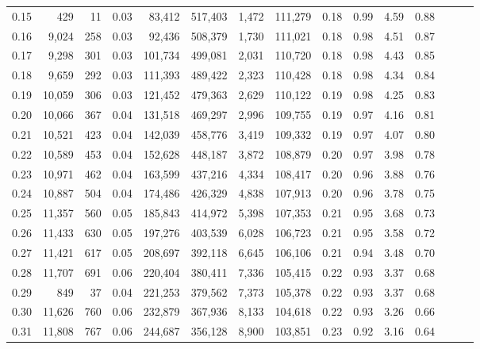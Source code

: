 \begin{tabular}{rrrrrrrrrrrrrrr}
0.15 &     429 &     11 &  0.03 &   83,412 &  517,403 &    1,472 &  111,279 &  0.18 &  0.99 &  4.59 &      0.88 \\
0.16 &   9,024 &    258 &  0.03 &   92,436 &  508,379 &    1,730 &  111,021 &  0.18 &  0.98 &  4.51 &      0.87 \\
0.17 &   9,298 &    301 &  0.03 &  101,734 &  499,081 &    2,031 &  110,720 &  0.18 &  0.98 &  4.43 &      0.85 \\
0.18 &   9,659 &    292 &  0.03 &  111,393 &  489,422 &    2,323 &  110,428 &  0.18 &  0.98 &  4.34 &      0.84 \\
0.19 &  10,059 &    306 &  0.03 &  121,452 &  479,363 &    2,629 &  110,122 &  0.19 &  0.98 &  4.25 &      0.83 \\
0.20 &  10,066 &    367 &  0.04 &  131,518 &  469,297 &    2,996 &  109,755 &  0.19 &  0.97 &  4.16 &      0.81 \\
0.21 &  10,521 &    423 &  0.04 &  142,039 &  458,776 &    3,419 &  109,332 &  0.19 &  0.97 &  4.07 &      0.80 \\
0.22 &  10,589 &    453 &  0.04 &  152,628 &  448,187 &    3,872 &  108,879 &  0.20 &  0.97 &  3.98 &      0.78 \\
0.23 &  10,971 &    462 &  0.04 &  163,599 &  437,216 &    4,334 &  108,417 &  0.20 &  0.96 &  3.88 &      0.76 \\
0.24 &  10,887 &    504 &  0.04 &  174,486 &  426,329 &    4,838 &  107,913 &  0.20 &  0.96 &  3.78 &      0.75 \\
0.25 &  11,357 &    560 &  0.05 &  185,843 &  414,972 &    5,398 &  107,353 &  0.21 &  0.95 &  3.68 &      0.73 \\
0.26 &  11,433 &    630 &  0.05 &  197,276 &  403,539 &    6,028 &  106,723 &  0.21 &  0.95 &  3.58 &      0.72 \\
0.27 &  11,421 &    617 &  0.05 &  208,697 &  392,118 &    6,645 &  106,106 &  0.21 &  0.94 &  3.48 &      0.70 \\
0.28 &  11,707 &    691 &  0.06 &  220,404 &  380,411 &    7,336 &  105,415 &  0.22 &  0.93 &  3.37 &      0.68 \\
0.29 &     849 &     37 &  0.04 &  221,253 &  379,562 &    7,373 &  105,378 &  0.22 &  0.93 &  3.37 &      0.68 \\
0.30 &  11,626 &    760 &  0.06 &  232,879 &  367,936 &    8,133 &  104,618 &  0.22 &  0.93 &  3.26 &      0.66 \\
0.31 &  11,808 &    767 &  0.06 &  244,687 &  356,128 &    8,900 &  103,851 &  0.23 &  0.92 &  3.16 &      0.64 \\

\end{tabular}

